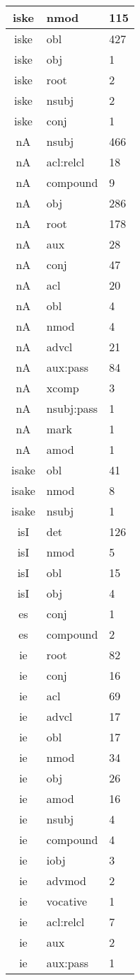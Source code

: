 \documentclass[a4 paper]{article}
\begin{document}
\begin{longtable}{cp{}p{}}
iske & nmod & 115\\ \midrule iske & obl & 427\\ \midrule iske & obj & 1\\ \midrule iske & root & 2\\ \midrule iske & nsubj & 2\\ \midrule iske & conj & 1\\ \midrule 
nA & nsubj & 466\\ \midrule nA & acl:relcl & 18\\ \midrule nA & compound & 9\\ \midrule nA & obj & 286\\ \midrule nA & root & 178\\ \midrule nA & aux & 28\\ \midrule nA & conj & 47\\ \midrule nA & acl & 20\\ \midrule nA & obl & 4\\ \midrule nA & nmod & 4\\ \midrule nA & advcl & 21\\ \midrule nA & aux:pass & 84\\ \midrule nA & xcomp & 3\\ \midrule nA & nsubj:pass & 1\\ \midrule nA & mark & 1\\ \midrule nA & amod & 1\\ \midrule 
isake & obl & 41\\ \midrule isake & nmod & 8\\ \midrule isake & nsubj & 1\\ \midrule 
isI & det & 126\\ \midrule isI & nmod & 5\\ \midrule isI & obl & 15\\ \midrule isI & obj & 4\\ \midrule 
es & conj & 1\\ \midrule es & compound & 2\\ \midrule 
ie & root & 82\\ \midrule ie & conj & 16\\ \midrule ie & acl & 69\\ \midrule ie & advcl & 17\\ \midrule ie & obl & 17\\ \midrule ie & nmod & 34\\ \midrule ie & obj & 26\\ \midrule ie & amod & 16\\ \midrule ie & nsubj & 4\\ \midrule ie & compound & 4\\ \midrule ie & iobj & 3\\ \midrule ie & advmod & 2\\ \midrule ie & vocative & 1\\ \midrule ie & acl:relcl & 7\\ \midrule ie & aux & 2\\ \midrule ie & aux:pass & 1\\ \midrule 

\end{longtable}
\end{document}
